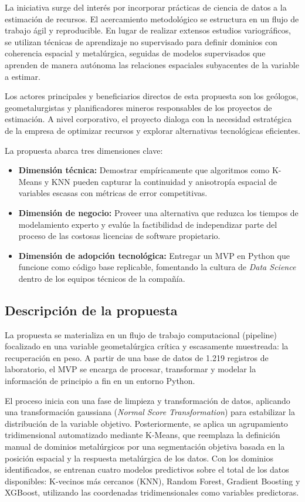 \documentclass[12pt,letterpaper]{article}
\begin{document}
	La iniciativa surge del interés por incorporar prácticas de ciencia de datos 
	a la estimación de recursos. El acercamiento metodológico se estructura en un 
	flujo de trabajo ágil y reproducible. En lugar de realizar extensos estudios 
	variográficos, se utilizan técnicas de aprendizaje no supervisado para definir 
	dominios con coherencia espacial y metalúrgica, seguidas de modelos supervisados 
	que aprenden de manera autónoma las relaciones espaciales subyacentes de la 
	variable a estimar.
	
	Los actores principales y beneficiarios directos de esta propuesta son los 
	geólogos, geometalurgistas y planificadores mineros responsables de los 
	proyectos de estimación. A nivel corporativo, el proyecto dialoga con la 
	necesidad estratégica de la empresa de optimizar recursos y explorar 
	alternativas tecnológicas eficientes.
	
	La propuesta abarca tres dimensiones clave:
	\begin{itemize}
		\item \textbf{Dimensión técnica:} Demostrar empíricamente que algoritmos 
		como K-Means y KNN pueden capturar la continuidad y anisotropía espacial 
		de variables escasas con métricas de error competitivas.
		\item \textbf{Dimensión de negocio:} Proveer una alternativa que reduzca 
		los tiempos de modelamiento experto y evalúe la factibilidad de independizar 
		parte del proceso de las costosas licencias de software propietario.
		\item \textbf{Dimensión de adopción tecnológica:} Entregar un MVP en Python 
		que funcione como código base replicable, fomentando la cultura de 
		\textit{Data Science} dentro de los equipos técnicos de la compañía.
	\end{itemize}
	
\subsection{Descripción de la propuesta}

	La propuesta se materializa en un flujo de trabajo computacional (pipeline) 
	focalizado en una variable geometalúrgica crítica y escasamente muestreada: 
	la recuperación en peso. A partir de una base de datos de 1.219 registros de 
	laboratorio, el MVP se encarga de procesar, transformar y modelar la 
	información de principio a fin en un entorno Python.
	
	El proceso inicia con una fase de limpieza y transformación de datos, 
	aplicando una transformación gaussiana (\textit{Normal Score Transformation}) 
	para estabilizar la distribución de la variable objetivo. Posteriormente, se 
	aplica un agrupamiento tridimensional automatizado mediante K-Means, que 
	reemplaza la definición manual de dominios metalúrgicos por una segmentación 
	objetiva basada en la posición espacial y la respuesta metalúrgica de los 
	datos. Con los dominios identificados, se entrenan cuatro modelos predictivos 
	sobre el total de los datos disponibles: K-vecinos más cercanos (KNN), Random 
	Forest, Gradient Boosting y XGBoost, utilizando las coordenadas tridimensionales 
	como variables predictoras.
	
\end{document}
